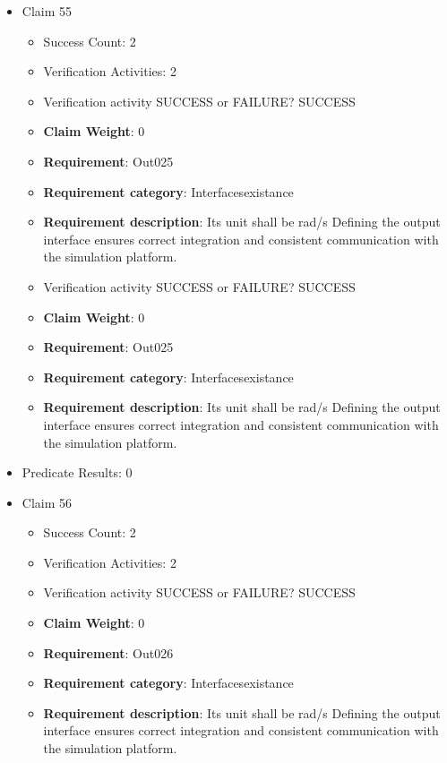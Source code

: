 \documentclass{article}
\begin{document}
\begin{itemize}
  				  \item Claim 55
				\begin{itemize}
			    	\item Success Count: 2 
			    	\item Verification Activities: 2
					\item Verification activity SUCCESS or FAILURE? SUCCESS
					\item \textbf{Claim Weight}: 0
						\item \textbf{Requirement}: Out025 
						\item \textbf{Requirement category}: Interfacesexistance 
						\item \textbf{Requirement description}: Its unit shall be rad/s Defining the output interface ensures correct integration and consistent communication with the simulation platform.
					
					\item Verification activity SUCCESS or FAILURE? SUCCESS
					\item \textbf{Claim Weight}: 0
						\item \textbf{Requirement}: Out025 
						\item \textbf{Requirement category}: Interfacesexistance 
						\item \textbf{Requirement description}: Its unit shall be rad/s Defining the output interface ensures correct integration and consistent communication with the simulation platform.
					
				\end{itemize}
				
									    
				\item Predicate Results: 0

  				  \item Claim 56
				\begin{itemize}
			    	\item Success Count: 2 
			    	\item Verification Activities: 2
					\item Verification activity SUCCESS or FAILURE? SUCCESS
					\item \textbf{Claim Weight}: 0
						\item \textbf{Requirement}: Out026 
						\item \textbf{Requirement category}: Interfacesexistance 
						\item \textbf{Requirement description}: Its unit shall be rad/s Defining the output interface ensures correct integration and consistent communication with the simulation platform.
					

\end{itemize}
\end{itemize}
\end{document}
